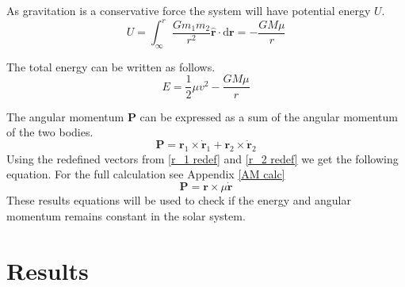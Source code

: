 \documentclass[reprint,english,notitlepage]{revtex4-2}
\begin{document}
As gravitation is a conservative force the system will have potential energy $ U $. 
\[
U = ∫ _{\infty} ^{r} \frac{Gm_1 m_2}{r^{2}}\mathbf{\hat{r}} ⋅ \mathrm{d}\mathbf{r} = - \frac{GM \mu}{r}
\] 

The total energy can be written as follows. 
\[
E = \frac{1}{2}μ v^{2}  - \frac{GM\mu}{r}
\]

The angular momentum $ \mathbf{P} $ can be expressed as a sum of the angular momentum of the two bodies. 
\[
\mathbf{P} = \mathbf{r}_1 × \mathbf{\dot{r}}_1 + \mathbf{r}_2 × \mathbf{\dot{r}}_2
\]
Using the redefined vectors from \ref{r_1 redef} and \ref{r_2 redef}  we get the following equation. For the full calculation see Appendix \ref{AM calc}
\[
\mathbf{P} = \mathbf{r} × μ \mathbf{\dot{r}}
\]
These results equations will be used to check if the energy and angular momentum remains constant in the solar system. 

\section{Results}
\end{document}
